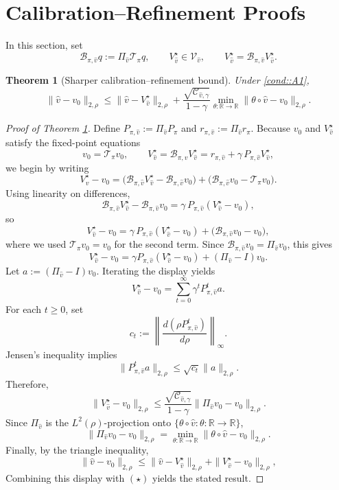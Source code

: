\documentclass{article}
\theoremstyle{plain}
\newtheorem{theorem}{Theorem}
\theoremstyle{definition}
\theoremstyle{remark}
\begin{document}
\section{Calibration--Refinement Proofs}

 
In this section, set
\[
\mathcal B_{\pi,\hat v}q
:=
\Pi_{\hat v}\mathcal T_\pi q,
\qquad
V_{\hat v}^\star\in\mathcal V_{\hat v},
\qquad
V_{\hat v}^\star
=
\mathcal B_{\pi,\hat v}V_{\hat v}^\star .
\]
 

 


\begin{theorem}[Sharper calibration--refinement bound]
\label{theorem::calrefineOracle}
Under \ref{cond::A1},
\[
\|\hat v-v_0\|_{2,\rho}
\le
\|\hat v-V_{\hat v}^\star\|_{2,\rho}
+
\frac{\sqrt{\mathcal C_{\hat v,\gamma}}}{1-\gamma}
\min_{\theta:\mathbb R\to\mathbb R}
\|\theta\circ\hat v-v_0\|_{2,\rho}.
\]
\end{theorem}

\begin{proof}[Proof of Theorem \ref{theorem::calrefineOracle}]
Define \(P_{\pi,\hat v} := \Pi_{\hat v}P_{\pi}\) and
\(r_{\pi,\hat{v}} := \Pi_{\hat v} r_{\pi}\). Because \(v_0\) and
\(V_{\hat v}^\star\) satisfy the fixed-point equations
\[
v_0 = \mathcal T_\pi v_0,
\qquad
V_{\hat v}^\star = \mathcal B_{\pi,\hat v} V_{\hat v}^\star
= r_{\pi,\hat{v}} + \gamma\,P_{\pi,\hat v}V_{\hat v}^\star,
\]
we begin by writing
\[
V_{\hat v}^\star - v_0
=
\bigl( \mathcal B_{\pi,\hat v}V_{\hat v}^\star
      - \mathcal B_{\pi,\hat v}v_0 \bigr)
+
\bigl( \mathcal B_{\pi,\hat v}v_0 - \mathcal{T}_\pi v_0 \bigr).
\]
Using linearity on differences,
\[
\mathcal B_{\pi,\hat v}V_{\hat v}^\star
-
\mathcal B_{\pi,\hat v}v_0
=
\gamma\,P_{\pi,\hat v}(V_{\hat v}^\star - v_0),
\]
so
\[
V_{\hat v}^\star - v_0
=
\gamma\,P_{\pi,\hat v}(V_{\hat v}^\star - v_0)
+
\bigl(\mathcal B_{\pi,\hat v}v_0 - v_0\bigr),
\]
where we used \(\mathcal T_\pi v_0 = v_0\) for the second term. Since
\(\mathcal B_{\pi,\hat v}v_0=\Pi_{\hat v}v_0\), this gives
\[
V_{\hat v}^\star-v_0
=
\gamma P_{\pi,\hat v}(V_{\hat v}^\star-v_0)
+
(\Pi_{\hat v}-I)v_0 .
\]
Let \(a:=(\Pi_{\hat v}-I)v_0\). Iterating the display yields
\[
V_{\hat v}^\star-v_0
=
\sum_{t=0}^\infty \gamma^t P_{\pi,\hat v}^t a .
\]
For each \(t\ge0\), set
\[
c_t
:=
\left\|
\frac{d(\rho P_{\pi,\hat v}^t)}{d\rho}
\right\|_\infty .
\]
Jensen's inequality implies
\[
\|P_{\pi,\hat v}^t a\|_{2,\rho}
\le
\sqrt{c_t}\|a\|_{2,\rho}.
\]
Therefore,
\[
\|V_{\hat v}^\star-v_0\|_{2,\rho}
\le
\frac{\sqrt{\mathcal C_{\hat v,\gamma}}}{1-\gamma}
\|\Pi_{\hat v}v_0-v_0\|_{2,\rho}.
\tag{$\star$}
\]
Since \(\Pi_{\hat v}\) is the \(L^2(\rho)\)-projection onto
\(\{\theta\circ\hat v:\theta:\mathbb R\to\mathbb R\}\),
\[
\|\Pi_{\hat v}v_0-v_0\|_{2,\rho}
=
\min_{\theta:\mathbb R\to\mathbb R}
\|\theta\circ\hat v-v_0\|_{2,\rho}.
\]
Finally, by the triangle inequality,
\[
\|\hat{v} - v_0\|_{2,\rho}
\le
\|\hat{v} - V_{\hat v}^\star\|_{2,\rho}
+
\|V_{\hat v}^\star - v_0\|_{2,\rho},
\]
Combining this display with \((\star)\) yields the stated result.
\end{proof}
\end{document}
